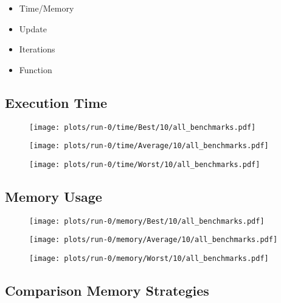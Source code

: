 \begin{itemize}
  \item Time/Memory
  \item Update
  \item Iterations
  \item Function
\end{itemize}



\subsection{Execution Time}

\begin{figure}[H]
  \begin{minipage}{.5\textwidth}
    \centering
    \texttt{[image: plots/run-0/time/Best/10/all\_benchmarks.pdf]}  
  \end{minipage}
  \begin{minipage}{.5\textwidth}
    \centering
    \texttt{[image: plots/run-0/time/Average/10/all\_benchmarks.pdf]}  
  \end{minipage}
\end{figure}

\begin{figure}[H]
  \centering
  \begin{minipage}[c]{.5\textwidth}
    \centering
    \texttt{[image: plots/run-0/time/Worst/10/all\_benchmarks.pdf]}  
  \end{minipage}
\end{figure}

\subsection{Memory Usage}

\begin{figure}[H]
  \begin{minipage}{.5\textwidth}
    \centering
    \texttt{[image: plots/run-0/memory/Best/10/all\_benchmarks.pdf]}  
  \end{minipage}
  \begin{minipage}{.5\textwidth}
    \centering
    \texttt{[image: plots/run-0/memory/Average/10/all\_benchmarks.pdf]}  
  \end{minipage}
\end{figure}

\begin{figure}[H]
  \centering
  \begin{minipage}[c]{.5\textwidth}
    \centering
    \texttt{[image: plots/run-0/memory/Worst/10/all\_benchmarks.pdf]}  
  \end{minipage}
\end{figure}

\subsection{Comparison Memory Strategies}